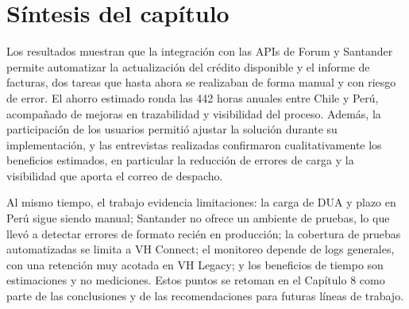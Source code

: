 \section{Síntesis del capítulo}

Los resultados muestran que la integración con las APIs de Forum y Santander permite automatizar la actualización del crédito disponible y el informe de facturas, dos tareas que hasta ahora se realizaban de forma manual y con riesgo de error. El ahorro estimado ronda las 442 horas anuales entre Chile y Perú, acompañado de mejoras en trazabilidad y visibilidad del proceso. Además, la participación de los usuarios permitió ajustar la solución durante su implementación, y las entrevistas realizadas confirmaron cualitativamente los beneficios estimados, en particular la reducción de errores de carga y la visibilidad que aporta el correo de despacho.

Al mismo tiempo, el trabajo evidencia limitaciones: la carga de DUA y plazo en Perú sigue siendo manual; Santander no ofrece un ambiente de pruebas, lo que llevó a detectar errores de formato recién en producción; la cobertura de pruebas automatizadas se limita a VH Connect; el monitoreo depende de logs generales, con una retención muy acotada en VH Legacy; y los beneficios de tiempo son estimaciones y no mediciones. Estos puntos se retoman en el Capítulo 8 como parte de las conclusiones y de las recomendaciones para futuras líneas de trabajo.
